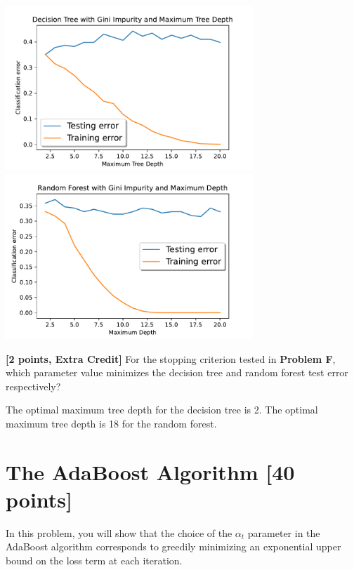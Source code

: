 \begin{solution}
    \begin{center}
        \includegraphics[width=0.7\textwidth]{fig2.pdf}
        \includegraphics[width=0.7\textwidth]{fig4.pdf}
    \end{center}
\end{solution}

\problem\textbf{[2 points, Extra Credit] }For the stopping criterion tested in \textbf{Problem F}, which parameter value minimizes the decision tree and random forest test error respectively? 

\begin{solution}
   The optimal maximum tree depth for the decision tree is 2. The optimal maximum tree depth is 18 for the random forest.
\end{solution}



\newpage
\section{The AdaBoost Algorithm [40 points]}

In this problem, you will show that the choice of the $\alpha_t$ parameter in
the AdaBoost algorithm corresponds to greedily minimizing an exponential upper
bound on the loss term at each iteration.

